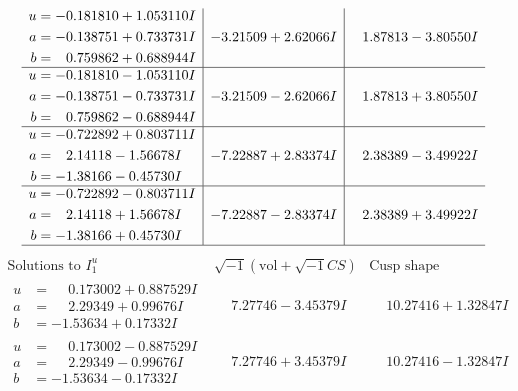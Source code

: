\documentclass[1p]{elsarticle_modified}
\theoremstyle{definition}
\newcommand{\I}{\sqrt{-1}}
\begin{document}
$$\begin{array}{c|c|c}
\begin{aligned}
u &= -0.181810 + 1.053110 I \\
a &= -0.138751 + 0.733731 I \\
b &= \phantom{-}0.759862 + 0.688944 I\end{aligned}
 & -3.21509 + 2.62066 I & \phantom{-}1.87813 - 3.80550 I \\ \hline\begin{aligned}
u &= -0.181810 - 1.053110 I \\
a &= -0.138751 - 0.733731 I \\
b &= \phantom{-}0.759862 - 0.688944 I\end{aligned}
 & -3.21509 - 2.62066 I & \phantom{-}1.87813 + 3.80550 I \\ \hline\begin{aligned}
u &= -0.722892 + 0.803711 I \\
a &= \phantom{-}2.14118 - 1.56678 I \\
b &= -1.38166 - 0.45730 I\end{aligned}
 & -7.22887 + 2.83374 I & \phantom{-}2.38389 - 3.49922 I \\ \hline\begin{aligned}
u &= -0.722892 - 0.803711 I \\
a &= \phantom{-}2.14118 + 1.56678 I \\
b &= -1.38166 + 0.45730 I\end{aligned}
 & -7.22887 - 2.83374 I & \phantom{-}2.38389 + 3.49922 I\\
 \hline 
 \end{array}$$\newpage$$\begin{array}{c|c|c}  
\text{Solutions to }I^u_{1}& \I (\text{vol} + \sqrt{-1}CS) & \text{Cusp shape}\\
 \hline 
\begin{aligned}
u &= \phantom{-}0.173002 + 0.887529 I \\
a &= \phantom{-}2.29349 + 0.99676 I \\
b &= -1.53634 + 0.17332 I\end{aligned}
 & \phantom{-}7.27746 - 3.45379 I & \phantom{-}10.27416 + 1.32847 I \\ \hline\begin{aligned}
u &= \phantom{-}0.173002 - 0.887529 I \\
a &= \phantom{-}2.29349 - 0.99676 I \\
b &= -1.53634 - 0.17332 I\end{aligned}
 & \phantom{-}7.27746 + 3.45379 I & \phantom{-}10.27416 - 1.32847 I \\ \hline\begin{aligned}

\end{aligned}
\end{array}$$
\end{document}
